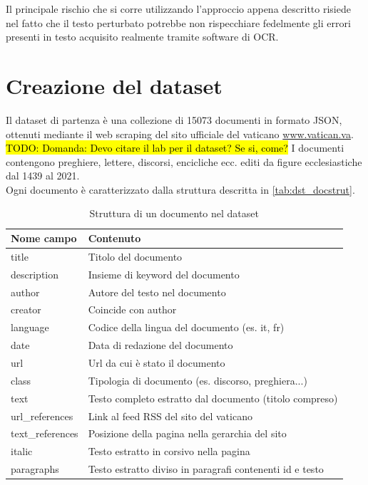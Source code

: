 Il principale rischio che si corre utilizzando l'approccio appena descritto risiede nel fatto che il testo perturbato potrebbe non rispecchiare fedelmente gli errori presenti in testo acquisito realmente tramite software di OCR.
\section{Creazione del dataset}
\label{dst:creazione}
Il dataset di partenza è una collezione di 15073 documenti in formato JSON, ottenuti mediante il web scraping del sito ufficiale del vaticano \url{www.vatican.va}. \hl{TODO: Domanda: Devo citare il lab per il dataset? Se si, come?} I documenti contengono preghiere, lettere, discorsi, encicliche ecc. editi da figure ecclesiastiche dal 1439 al 2021.\\
Ogni documento è caratterizzato dalla struttura descritta in \autoref{tab:dst_docstrut}.


\begin{table}[H]
\centering
\begin{tabular}{ll}
\textbf{Nome campo} & \textbf{Contenuto} \\ \hline
title & Titolo del documento \\
description & Insieme di keyword del documento\\
author & Autore del testo nel documento \\
creator & Coincide con author \\
language & Codice della lingua del documento (es. it, fr) \\
date & Data di redazione del documento \\
url & Url da cui è stato il documento \\
class & Tipologia di documento (es. discorso, preghiera...)\\
text & Testo completo estratto dal documento (titolo compreso)\\
url\_references & Link al feed RSS del sito del vaticano \\
text\_references & Posizione della pagina nella gerarchia del sito\\
italic & Testo estratto in corsivo nella pagina \\
paragraphs & Testo estratto diviso in paragrafi contenenti id e testo
\end{tabular}
\caption{Struttura di un documento nel dataset}
\label{tab:dst_docstrut}
\end{table}

